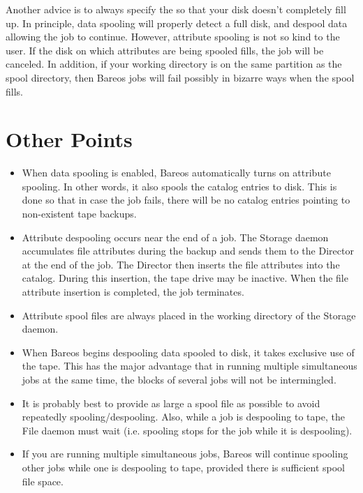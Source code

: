 
Another advice is to always specify the  so that your disk
doesn't completely fill up. In principle, data spooling will properly detect a
full disk, and despool data allowing the job to continue. However, attribute
spooling is not so kind to the user. If the disk on which attributes are being
spooled fills, the job will be canceled. In addition, if your working
directory is on the same partition as the spool directory, then Bareos jobs
will fail possibly in bizarre ways when the spool fills.

\label{points}
\section{Other Points}

\begin{itemize}
\item When data spooling is enabled, Bareos automatically  turns on attribute
   spooling. In other words, it also  spools the catalog entries to disk. This is
   done so  that in case the job fails, there will be no catalog  entries
   pointing to non-existent tape backups.
\item Attribute despooling occurs near the end of a job.  The Storage daemon
   accumulates file attributes during the backup and  sends them to the
   Director at the end of the job.  The Director then inserts the file
   attributes into the catalog.  During this insertion, the tape drive may
   be inactive.  When the file attribute insertion is completed, the job
   terminates.
\item Attribute spool files are always placed in the  working directory of
   the Storage daemon.
\item When Bareos begins despooling data spooled to disk, it  takes exclusive
   use of the tape. This has the major  advantage that in running multiple
   simultaneous jobs at  the same time, the blocks of several jobs will not be
   intermingled.
\item It is probably best to provide as large a spool file as  possible to
   avoid repeatedly spooling/despooling. Also,  while a job is despooling to
   tape, the File daemon must wait  (i.e. spooling stops for the job while it is
   despooling).
\item If you are running multiple simultaneous jobs, Bareos  will continue
   spooling other jobs while one is despooling  to tape, provided there is
   sufficient spool file space.
\end{itemize}
